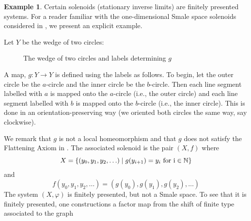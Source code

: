 \documentclass{amsart}
\newcommand{\N}{\mathbb{N}}
\renewcommand{\S}{\mathscr{S}}
\theoremstyle{plain}
\theoremstyle{definition}
\newtheorem{example}[theorem]{Example}
\theoremstyle{remark}
\begin{document}
\begin{example}
Certain solenoids (stationary inverse limits) are finitely presented systems. For a reader familiar with the one-dimensional Smale space solenoids considered in \cite{WilOneDim, Wil, Yi2001, Yi2003}, we present an explicit example. 

Let $Y$ be the wedge of two circles:

\begin{figure}[h]
\caption{The wedge of two circles and labels determining $g$}
\label{Figure-aab/ab-PreSolenoid}
\end{figure}
A map, $g : Y \rightarrow Y$ is defined using the labels as follows. To begin, let the outer circle be the $a$-circle and the inner circle be the $b$-circle. Then each line segment labelled with $a$ is mapped onto the $a$-circle (i.e., the outer circle) and each line segment labelled with $b$ is mapped onto the $b$-circle (i.e., the inner circle). This is done in an orientation-preserving way (we oriented both circles the same way, say clockwise). 

We remark that $g$ is not a local homeomorphism and that $g$ does not satisfy the Flattening Axiom in \cite{WilOneDim, Yi2001}. The associated solenoid is the pair $(X, f)$ where 
\[ X= \{ (y_0, y_1, y_2, \ldots ) \mid g(y_{i+1})=y_i \hbox{ for i} \in \N \}
\]
and
\[ f(y_0, y_1, y_2, \ldots )=( g(y_0), g(y_1), g(y_2), \ldots) \]
The system $(X, \varphi)$ is finitely presented, but not a Smale space. To see that it is finitely presented, one constructions a factor map from the shift of finite type associated to the graph

\vspace{1em}
\begin{center}
\end{center}
\end{example}
\end{document}
